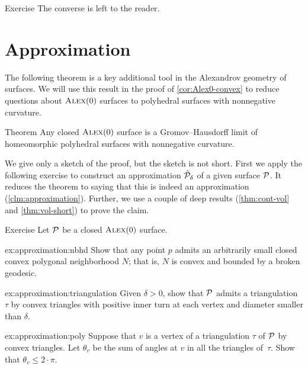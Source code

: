 \begin{thm}{Exercise}\label{ex:poly-CBB}
The converse is left to the reader.\qeds
\end{thm}

\section{Approximation}

The following theorem is a key additional tool in the Alexandrov geometry of surfaces.
We will use this result in the proof of \ref{cor:Alex0-convex} to reduce questions about $\textup{\textsc{Alex}}(0)$ surfaces to polyhedral surfaces with nonnegative curvature.


\begin{thm}{Theorem}\label{thm:approximation}
Any closed $\textup{\textsc{Alex}}(0)$ surface is a Gromov--Hausdorff limit of homeomorphic polyhedral surfaces with nonnegative curvature.
\end{thm}

We give only a sketch of the proof, but the sketch is not short.
First we apply the following exercise to construct an approximation $\tilde{\mathcal{P}}_\delta$ of a given surface $\mathcal{P}$.
It reduces the theorem to saying that this is indeed an approximation (\ref{clm:approximation}).
Further, we use a couple of deep results (\ref{thm:cont-vol} and \ref{thm:vol-short}) to prove the claim.

\begin{thm}{Exercise}\label{ex:construction}
Let $\mathcal{P}$ be a closed $\textup{\textsc{Alex}}(0)$ surface.

\begin{subthm}{ex:approximation:nbhd}
Show that any point $p$ admits an arbitrarily small closed convex polygonal neighborhood $N$;
that is, $N$ is convex and bounded by a broken geodesic.

\end{subthm}

\begin{subthm}{ex:approximation:triangulation}
Given $\delta>0$, show that $\mathcal{P}$ admits a triangulation $\tau$ by convex triangles
with positive inner turn at each vertex and diameter smaller than $\delta$.
\end{subthm}

\begin{subthm}{ex:approximation:poly}
Suppose that $v$ is a vertex of a triangulation $\tau$ of $\mathcal{P}$ by convex triangles.
Let $\theta_v$ be the sum of angles at $v$ in all the triangles of~$\tau$.
Show that $\theta_v\le 2\cdot\pi$.
\end{subthm}

\end{thm}

